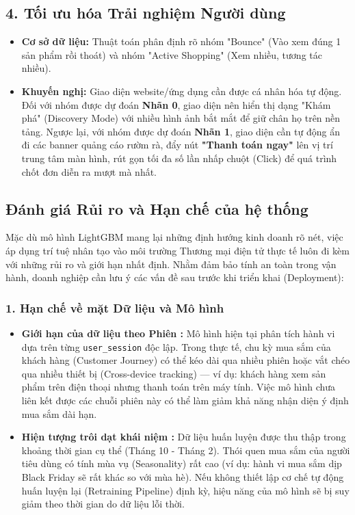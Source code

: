 \documentclass[a4paper,11pt]{article}
\begin{document}
\subsection*{4. Tối ưu hóa Trải nghiệm Người dùng }
\begin{itemize}[itemsep=4pt, leftmargin=*]
    \item \textbf{Cơ sở dữ liệu:} Thuật toán phân định rõ nhóm "Bounce" (Vào xem đúng 1 sản phẩm rồi thoát) và nhóm "Active Shopping" (Xem nhiều, tương tác nhiều).
    \item \textbf{Khuyến nghị:} Giao diện website/ứng dụng cần được cá nhân hóa tự động. Đối với nhóm được dự đoán \textbf{Nhãn 0}, giao diện nên hiển thị dạng "Khám phá" (Discovery Mode) với nhiều hình ảnh bắt mắt để giữ chân họ trên nền tảng. Ngược lại, với nhóm được dự đoán \textbf{Nhãn 1}, giao diện cần tự động ẩn đi các banner quảng cáo rườm rà, đẩy nút \textbf{"Thanh toán ngay"} lên vị trí trung tâm màn hình, rút gọn tối đa số lần nhấp chuột (Click) để quá trình chốt đơn diễn ra mượt mà nhất.
\end{itemize}
\subsection{Đánh giá Rủi ro và Hạn chế của hệ thống }

Mặc dù mô hình LightGBM mang lại những định hướng kinh doanh rõ nét, việc áp dụng trí tuệ nhân tạo vào môi trường Thương mại điện tử thực tế luôn đi kèm với những rủi ro và giới hạn nhất định. Nhằm đảm bảo tính an toàn trong vận hành, doanh nghiệp cần lưu ý các vấn đề sau trước khi triển khai (Deployment):

\subsubsection*{1. Hạn chế về mặt Dữ liệu và Mô hình }
\begin{itemize}[itemsep=4pt, leftmargin=*]
    \item \textbf{Giới hạn của dữ liệu theo Phiên :} Mô hình hiện tại phân tích hành vi dựa trên từng \texttt{user\_session} độc lập. Trong thực tế, chu kỳ mua sắm của khách hàng (Customer Journey) có thể kéo dài qua nhiều phiên hoặc vắt chéo qua nhiều thiết bị (Cross-device tracking) — ví dụ: khách hàng xem sản phẩm trên điện thoại nhưng thanh toán trên máy tính. Việc mô hình chưa liên kết được các chuỗi phiên này có thể làm giảm khả năng nhận diện ý định mua sắm dài hạn.
    \item \textbf{Hiện tượng trôi dạt khái niệm :} Dữ liệu huấn luyện được thu thập trong khoảng thời gian cụ thể (Tháng 10 - Tháng 2). Thói quen mua sắm của người tiêu dùng có tính mùa vụ (Seasonality) rất cao (ví dụ: hành vi mua sắm dịp Black Friday sẽ rất khác so với mùa hè). Nếu không thiết lập cơ chế tự động huấn luyện lại (Retraining Pipeline) định kỳ, hiệu năng của mô hình sẽ bị suy giảm theo thời gian do dữ liệu lỗi thời.
\end{itemize}
\end{document}
